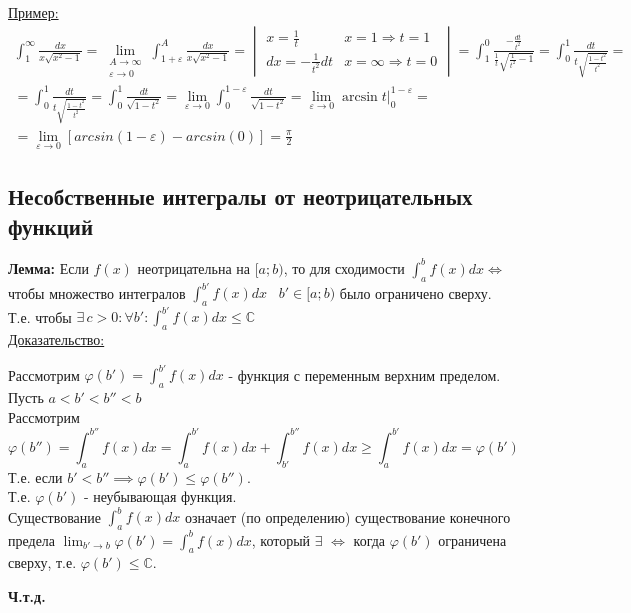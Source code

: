 \documentclass[12pt]{article}
\begin{document}
    \underline{Пример:}
    \begin{gather*}
        \int_{1}^{\infty}\frac{dx}{x\sqrt{x^2-1}}=\lim_{\substack{A \to \infty \\ \varepsilon \to 0}} \int_{1+\varepsilon}^{A} \frac{dx}{x\sqrt{x^2-1}} =
        \begin{vmatrix}
            x=\frac{1}{t} & x=1 \Rightarrow t=1\\
            dx=-\frac{1}{t^2}dt & x=\infty \Rightarrow t=0
        \end{vmatrix} = \int_{1}^{0} \frac{-\frac{dt}{t^2}}{\frac{1}{t}\sqrt{\frac{1}{t^2}-1}}=\int_{0}^{1}\frac{dt}{t\sqrt{\frac{1-t^2}{t^2}}}=\\
        = \int_{0}^{1} \frac{dt}{t\sqrt{\frac{1-t^2}{t^2}}}=
        \int_{0}^{1}\frac{dt}{\sqrt{1-t^2}}=\lim_{\varepsilon \to 0} \int_{0}^{1-\varepsilon}\frac{dt}{\sqrt{1-t^2}}=\lim_{\varepsilon \to 0} \arcsin t\Big|^{1-\varepsilon}_0=\\
        = \lim_{\varepsilon \to 0}[arcsin(1-\varepsilon)-arcsin(0)]=\frac{\pi}{2}
    \end{gather*}

    \subsection{Несобственные интегралы от неотрицательных функций}
    \textbf{Лемма:} Если $f(x)$ неотрицательна на $[a;b)$, то для сходимости $\int_{a}^{b}f(x)dx \Longleftrightarrow $ чтобы множество интегралов $\int_{a}^{b'} f(x)dx \;\;\; b' \in [a;b)$ было ограничено сверху.\\
    Т.е. чтобы $\exists\,c>0:\forall b':\int_{a}^{b'}f(x)dx \leq \mathbb{C}$\\
    \underline{Доказательство:}
    \begin{adjustwidth}{1.5em}{1.5em}
        Рассмотрим $\varphi(b') = \int_{a}^{b'} f(x)dx$ - функция с переменным верхним пределом.\\
        Пусть $a<b'<b''<b$\\
        Рассмотрим 
        \[ \varphi(b'')=\int_{a}^{b''}f(x)dx = \int_{a}^{b'}f(x)dx+\int_{b'}^{b''}f(x)dx\geq \int_{a}^{b'}f(x)dx=\varphi(b')\]
        Т.е. если $b'<b'' \implies \varphi(b')\leq \varphi(b'')$.\\
        Т.е. $\varphi(b')$ - неубывающая функция.\\
        Существование $\int_{a}^{b}f(x)dx$ означает (по определению) существование конечного предела $\lim_{b' \to b}\varphi(b')=\int_{a}^{b}f(x)dx$, который $\exists$ $\Longleftrightarrow$ когда $\varphi(b')$
        ограничена сверху, т.е. $\varphi(b') \leq \mathbb{C}$.
        \begin{center}
            \textbf{Ч.т.д.}
        \end{center}
    \end{adjustwidth}
\end{document}
